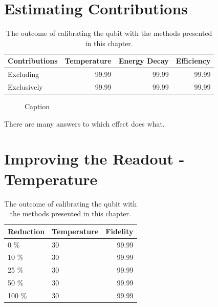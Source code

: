 \section{Estimating Contributions}


\begin{table}[h]
\centering
\caption{The outcome of calibrating the qubit with the methods presented in this chapter.}
\begin{tabular}{l|rrr}
\hline
\textbf{Contributions}        & Temperature              & Energy Decay   & Efficiency  \\ \hline
Excluding                     &  99.99          &  99.99 &  99.99 \\
Exclusively                   &  99.99          &  99.99 &  99.99
\end{tabular}
\label{tab:readout_infidelity_contribution_estimation}
\end{table}

\begin{figure}
    \centering
    \caption{Caption}
    \label{fig:enter-label}
\end{figure}

There are many answers to which effect does what.

\section{Improving the Readout - Temperature}

\begin{table}[h]
\centering
\caption{The outcome of calibrating the qubit with the methods presented in this chapter.}
\begin{tabular}{ll|r}
\hline
\textbf{Reduction}        & Temperature                  & Fidelity\\ \hline
0   \%                      &  30                        &  99.99\\
10  \%                     &  30                         &  99.99\\
25  \%                     &  30                         &  99.99\\
50  \%                     &  30                         &  99.99\\
100 \%                     &  30                         &  99.99\\
\end{tabular}
\label{tab:readout_infidelity_contribution_estimation}
\end{table}


